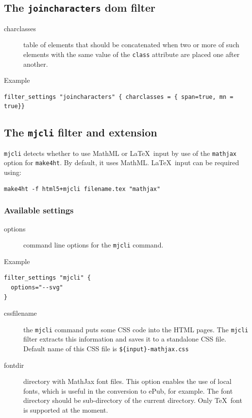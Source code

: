 \subsection{\texorpdfstring{The \texttt{joincharacters} dom
filter}{The joincharacters dom filter}}\label{the-joincharacters-dom-filter}

\begin{description}
\item[charclasses]
table of elements that should be concatenated when two or more of such
elements with the same value of the \texttt{class} attribute are placed
one after another.
\end{description}

Example

\begin{verbatim}
filter_settings "joincharacters" { charclasses = { span=true, mn = true}}
\end{verbatim}

\subsection{\texorpdfstring{The \texttt{mjcli} filter and
extension}{The mjcli filter and extension}}\label{mathjaxsettings}

\texttt{mjcli} detects whether to use MathML or \LaTeX~input by use of
the \texttt{mathjax} option for \texttt{make4ht}. By default, it uses
MathML. \LaTeX~input can be required using:

\begin{verbatim}
make4ht -f html5+mjcli filename.tex "mathjax"
\end{verbatim}

\subsubsection{Available settings}\label{available-settings}

\begin{description}
\item[options]
command line options for the \texttt{mjcli} command.
\end{description}

Example

\begin{verbatim}
filter_settings "mjcli" {
  options="--svg"
}
\end{verbatim}

\begin{description}
\item[cssfilename]
the \texttt{mjcli} command puts some CSS code into the HTML pages. The
\texttt{mjcli} filter extracts this information and saves it to a
standalone CSS file. Default name of this CSS file is
\texttt{\$\{input\}-mathjax.css}
\item[fontdir]
directory with MathJax font files. This option enables the use of local
fonts, which is useful in the conversion to ePub, for example. The font
directory should be sub-directory of the current directory. Only
\TeX~font is supported at the moment.
\end{description}

